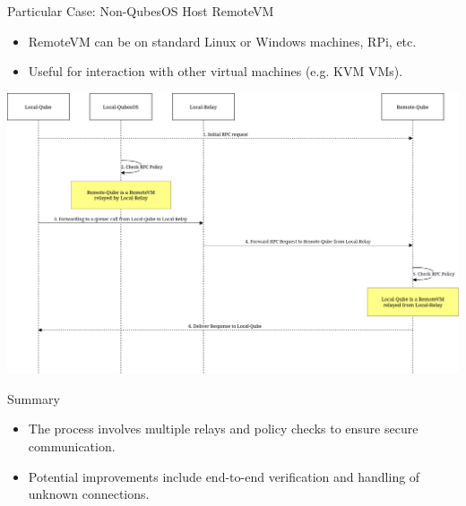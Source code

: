 \documentclass{beamer}
\begin{document}
\begin{frame}{Particular Case: Non-QubesOS Host RemoteVM}
    \begin{itemize}
        \item RemoteVM can be on standard Linux or Windows machines, RPi, etc.
        \item Useful for interaction with other virtual machines (e.g. KVM VMs).
    \end{itemize}
	\begin{center}
        \includegraphics[width=\linewidth]{particular.png}
    \end{center}
\end{frame}

\begin{frame}{Summary}
    \begin{itemize}
        \item The process involves multiple relays and policy checks to ensure secure communication.
        \item Potential improvements include end-to-end verification and handling of unknown connections.
    \end{itemize}
\end{frame}
\end{document}
